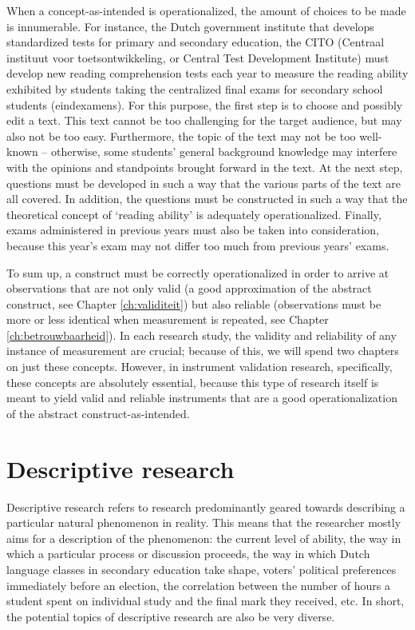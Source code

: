 \documentclass[
]{book}
\begin{document}
When a concept-as-intended is operationalized, the amount of choices to be made is innumerable. For instance, the Dutch government institute that develops standardized tests for primary and secondary education, the CITO (Centraal instituut voor toetsontwikkeling, or Central Test Development Institute) must develop new reading comprehension tests each year to measure the reading ability exhibited by students taking the centralized final exams for secondary school students (eindexamens). For this purpose, the first step is to choose and possibly edit a text. This text cannot be too challenging for the target audience, but may also not be too easy. Furthermore, the topic of the text may not be too well-known -- otherwise, some students' general background knowledge may interfere with the opinions and standpoints brought forward in the text. At the next step, questions must be developed in such a way that the various parts of the text are all covered. In addition, the questions must be constructed in such a way that the theoretical concept of `reading ability' is adequately operationalized. Finally, exams administered in previous years must also be taken into consideration, because this year's exam may not differ too much from previous years' exams.

To sum up, a construct must be correctly operationalized in order to arrive at observations that are not only valid (a good approximation of the abstract construct, see Chapter \ref{ch:validiteit}) but also reliable (observations must be more or less identical when measurement is repeated, see Chapter \ref{ch:betrouwbaarheid}). In each research study, the validity and reliability of any instance of measurement are crucial; because of this, we will spend two chapters on just these concepts. However, in instrument validation research, specifically, these concepts are absolutely essential, because this type of research itself is meant to yield valid and reliable instruments that are a good operationalization of the abstract construct-as-intended.

\hypertarget{sec:descriptive-research}{%
\section{Descriptive research}\label{sec:descriptive-research}}

Descriptive research refers to research predominantly geared towards describing a particular natural phenomenon in reality. This means that the researcher mostly aims for a description of the phenomenon: the current level of ability, the way in which a particular process or discussion proceeds, the way in which Dutch language classes in secondary education take shape, voters' political preferences immediately before an election, the correlation between the number of hours a student spent on individual study and the final mark they received, etc. In short, the potential topics of descriptive research are also be very diverse.
\end{document}
